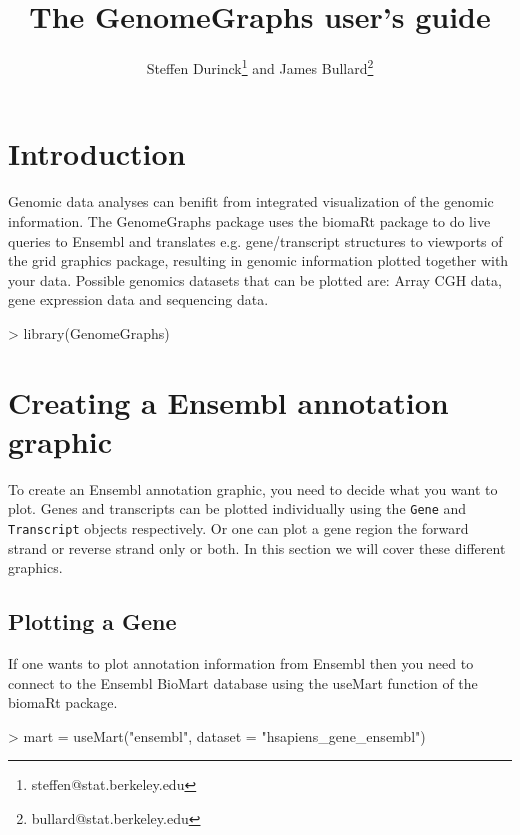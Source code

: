\documentclass[11pt]{article}
\author{Steffen Durinck\footnote{steffen@stat.berkeley.edu} and James
  Bullard\footnote{bullard@stat.berkeley.edu}}
\newcommand{\Robject}[1]{{\texttt{#1}}}
\begin{document}
\title{The GenomeGraphs user's guide}

\maketitle

\tableofcontents
\section{Introduction}

Genomic data analyses can benifit from integrated visualization of the
genomic information.  The GenomeGraphs package uses the biomaRt
package to do live queries to Ensembl and translates
e.g. gene/transcript structures to viewports of the grid graphics
package, resulting in genomic information plotted together with your
data.  Possible genomics datasets that can be plotted are: Array CGH
data, gene expression data and sequencing data.

\begin{Schunk}
\begin{Sinput}
> library(GenomeGraphs)
\end{Sinput}
\end{Schunk}

\section{Creating a Ensembl annotation graphic}

To create an Ensembl annotation graphic, you need to decide what you
want to plot.  Genes and transcripts can be plotted individually using
the \Robject{Gene} and \Robject{Transcript} objects respectively.  Or
one can plot a gene region the forward strand or reverse strand only
or both.  In this section we will cover these different graphics.

\subsection{Plotting a Gene}

If one wants to plot annotation information from Ensembl then you need
to connect to the Ensembl BioMart database using the useMart function
of the biomaRt package.

\begin{Schunk}
\begin{Sinput}
> mart = useMart("ensembl", dataset = "hsapiens_gene_ensembl")
\end{Sinput}
\end{Schunk}
\end{document}

